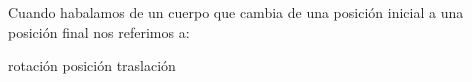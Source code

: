 
\question Cuando habalamos de un cuerpo que cambia de una posición inicial a
      una posición final nos referimos a:

  \begin{oneparchoices}
    \choice rotación
    \choice posición 
    \CorrectChoice traslación 
  \end{oneparchoices}
